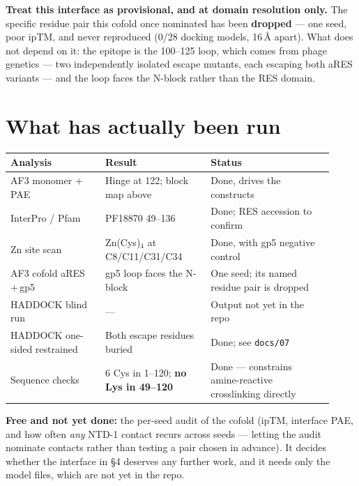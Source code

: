 \documentclass[11pt,a4paper]{article}
\begin{document}
\textbf{Treat this interface as provisional, and at domain resolution only.} The specific residue
pair this cofold once nominated has been \textbf{dropped} --- one seed, poor ipTM, and never
reproduced (0/28 docking models, 16\,\AA{} apart). What does not depend on it: the epitope is the
100--125 loop, which comes from phage genetics --- two independently isolated escape mutants, each
escaping both aRES variants --- and the loop faces the N-block rather than the RES domain.

\section{What has actually been run}

\begin{center}
\small
\begin{tabular}{@{}p{0.27\linewidth}p{0.30\linewidth}p{0.35\linewidth}@{}}
\toprule
\textbf{Analysis} & \textbf{Result} & \textbf{Status}\\
\midrule
AF3 monomer + PAE & Hinge at 122; block map above & Done, drives the constructs\\
InterPro / Pfam & PF18870 49--136 & Done; RES accession to confirm\\
Zn site scan & Zn(Cys)$_4$ at C8/C11/C31/C34 & Done, with gp5 negative control\\
AF3 cofold aRES\,+\,gp5 & gp5 loop faces the N-block & One seed; its named residue pair is dropped\\
HADDOCK blind run & --- & Output not yet in the repo\\
HADDOCK one-sided restrained & Both escape residues buried & Done; see \texttt{docs/07}\\
Sequence checks & 6 Cys in 1--120; \textbf{no Lys in 49--120} & Done --- constrains amine-reactive
crosslinking directly\\
\bottomrule
\end{tabular}
\end{center}

\textbf{Free and not yet done:} the per-seed audit of the cofold (ipTM, interface PAE, and how often
\emph{any} NTD-1 contact recurs across seeds --- letting the audit nominate contacts rather than
testing a pair chosen in advance). It decides whether the interface in \S4 deserves any further work,
and it needs only the model files, which are not yet in the repo.

\setlength{\fboxsep}{8pt}
\noindent{}
\end{document}
